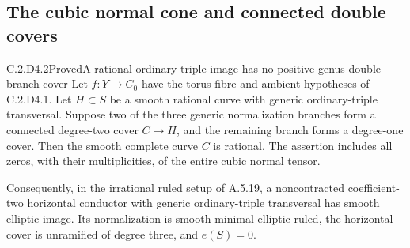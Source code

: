 \subsection{The cubic normal cone and connected double covers}

\begin{statement}{C.2.D4.2}{Proved}{A rational ordinary-triple image has no positive-genus double branch cover}
Let $f:Y\to C_0$ have the torus-fibre and ambient hypotheses
of C.2.D4.1. Let $H\subset S$ be a smooth rational curve
with generic ordinary-triple transversal. Suppose two of
the three generic normalization branches form a connected
degree-two cover $C\to H$, and the remaining branch forms
a degree-one cover. Then the smooth complete curve $C$
is rational. The assertion includes all zeros, with their
multiplicities, of the entire cubic normal tensor.

Consequently, in the irrational ruled setup of A.5.19,
a noncontracted coefficient-two horizontal conductor
with generic ordinary-triple transversal has smooth
elliptic image. Its normalization is smooth minimal
elliptic ruled, the horizontal cover is unramified of
degree three, and $e(S)=0$.
\end{statement}
